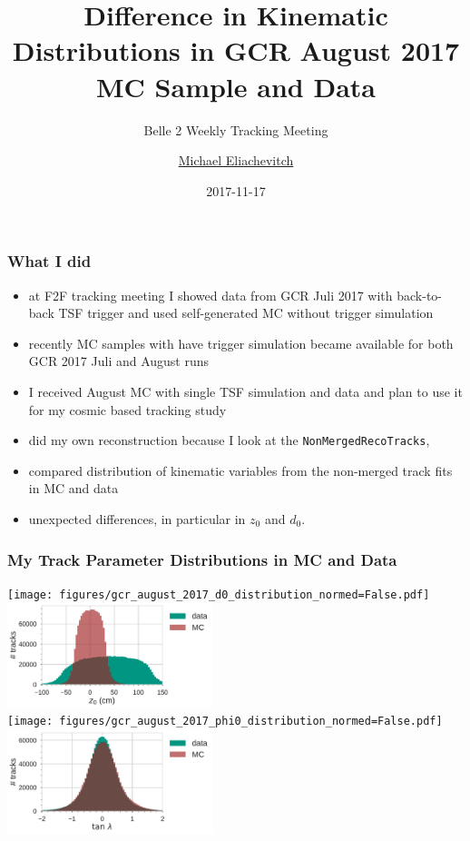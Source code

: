 \documentclass[18pt]{beamer}
\title{Difference in Kinematic Distributions in GCR August  2017 MC Sample and Data}
\subtitle{Belle 2 Weekly Tracking Meeting}
\author{\underline{Michael Eliachevitch}}
\date{2017-11-17}
\institute{ETP - KIT}
\begin{document}
  
  \begin{frame}
  \titlepage
\end{frame}

\begin{frame}
  \frametitle{What I did}
  \begin{itemize}
  \item at F2F tracking meeting I showed data from GCR Juli 2017 with back-to-back TSF trigger and used self-generated MC without trigger simulation
  \item recently MC samples with have trigger simulation became available for both GCR 2017 Juli and August runs 
  \item I received August MC with single TSF simulation and data and plan to use it for my cosmic based tracking study
  \item did my own reconstruction because I look at the \texttt{NonMergedRecoTracks},
  \item compared  distribution of kinematic variables from the non-merged track fits in MC and data
  \item unexpected differences, in particular in $z_0$ and $d_0$.
  \end{itemize}
\end{frame}

\begin{frame}
  \frametitle{My Track Parameter Distributions in MC and Data}
  \texttt{[image: figures/gcr\_august\_2017\_d0\_distribution\_normed=False.pdf]}
  \includegraphics[width=0.45\textwidth]{figures/gcr_august_2017_z0_distribution_normed=False.pdf}\\
  \texttt{[image: figures/gcr\_august\_2017\_phi0\_distribution\_normed=False.pdf]}
  \includegraphics[width=0.45\textwidth]{figures/gcr_august_2017_tan_lambda_distribution_normed=False.pdf}
\end{frame}
\end{document}
